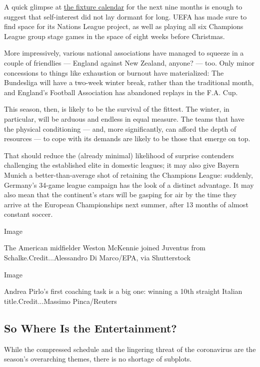 A quick glimpse at
\href{https://www.uefa.com/insideuefa/about-uefa/news/025c-0f8e787ef28c-879e44a21e77-1000--updated-uefa-competitions-calendar/}{the
fixture calendar} for the next nine months is enough to suggest that
self-interest did not lay dormant for long. UEFA has made sure to find
space for its Nations League project, as well as playing all six
Champions League group stage games in the space of eight weeks before
Christmas.

More impressively, various national associations have managed to squeeze
in a couple of friendlies --- England against New Zealand, anyone? ---
too. Only minor concessions to things like exhaustion or burnout have
materialized: The Bundesliga will have a two-week winter break, rather
than the traditional month, and England's Football Association has
abandoned replays in the F.A. Cup.

This season, then, is likely to be the survival of the fittest. The
winter, in particular, will be arduous and endless in equal measure. The
teams that have the physical conditioning --- and, more significantly,
can afford the depth of resources --- to cope with its demands are
likely to be those that emerge on top.

That should reduce the (already minimal) likelihood of surprise
contenders challenging the established elite in domestic leagues; it may
also give Bayern Munich a better-than-average shot of retaining the
Champions League: suddenly, Germany's 34-game league campaign has the
look of a distinct advantage. It may also mean that the continent's
stars will be gasping for air by the time they arrive at the European
Championships next summer, after 13 months of almost constant soccer.

Image

The American midfielder Weston McKennie joined Juventus from
Schalke.Credit...Alessandro Di Marco/EPA, via Shutterstock

Image

Andrea Pirlo's first coaching task is a big one: winning a 10th straight
Italian title.Credit...Massimo Pinca/Reuters

\hypertarget{so-where-is-the-entertainment}{%
\subsection{So Where Is the
Entertainment?}\label{so-where-is-the-entertainment}}

While the compressed schedule and the lingering threat of the
coronavirus are the season's overarching themes, there is no shortage of
subplots.

